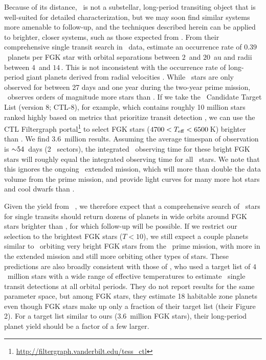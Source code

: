 \documentclass[twocolumn]{aastex63}
\begin{document}
Because of its distance, \thisstarb\ is not a substellar, long-period transiting object that is well-suited for detailed characterization, but we may soon find similar systems more amenable to follow-up, and the techniques described herein can be applied to brighter, closer systems, such as those expected from \tess. From their comprehensive single transit search in \kep\ data, \citet{kawahara:2019} estimate an occurrence rate of $0.39$\ planets per FGK star with orbital separations between $2$\ and $20$\ au and radii between $4$\ and $14$\,\rearth. This is not inconsistent with the occurrence rate of long-period giant planets derived from radial velocities \citep{fulton:2021}. While \tess\ stars are only observed for between 27 days and one year during the two-year prime mission, \tess\ observes orders of magnitude more stars than \kep. If we take the \tess\ Candidate Target List (version 8; CTL-8), for example, which contains roughly 10 million stars ranked highly based on metrics that prioritize transit detection \citep{stassun:2018b,stassun:2019}, we can use the CTL Filtergraph portal\footnote{\url{ http://filtergraph.vanderbilt.edu/tess_ctl}} \citep{filtergraph} to select FGK stars ($4700 < \teff < 6500$\,K) brighter than \thisstar. We find $3.6$\ million results. Assuming the average timespan of observation is $\mathord{\sim} 54$\ days (2 \tess\ sectors), the integrated \tess\ observing time for these bright FGK stars will roughly equal the integrated observing time for all \kep\ stars. We note that this ignores the ongoing \tess\ extended mission, which will more than double the data volume from the prime mission, and provide light curves for many more hot stars and cool dwarfs than \kep. 

Given the yield from \kep\ \citep[67;][]{kawahara:2019}, we therefore expect that a comprehensive search of \tess\ stars for single transits should return dozens of planets in wide orbits around FGK stars brighter than \thisstar, for which follow-up will be possible. If we restrict our selection to the brightest FGK stars ($T<10$), we still expect a couple planets similar to \thisstarb\ orbiting very bright FGK stars from the \tess\ prime mission, with more in the extended mission and still more orbiting other types of stars. These predictions are also broadly consistent with those of \citet{villanueva:2019}, who used a target list of $4$\ million stars with a wide range of effective temperatures to estimate \tess\ single transit detections at all orbital periods. They do not report results for the same parameter space, but among FGK stars, they estimate 18 habitable zone planets even though FGK stars make up only a fraction of their target list (their Figure 2). For a target list similar to ours ($3.6$\ million FGK stars), their long-period planet yield should be a factor of a few larger. 
\end{document}
